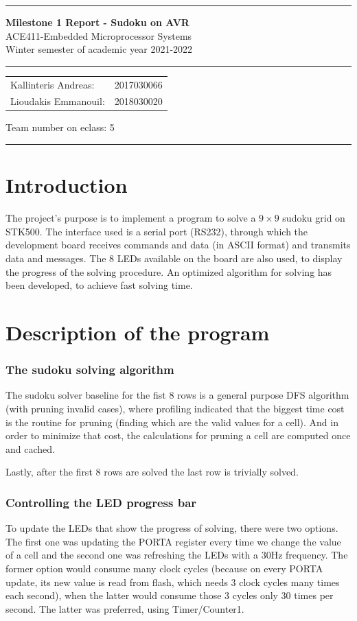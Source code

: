\documentclass[12pt, a4, hidelinks]{article}
\begin{document}
\noindent \rule{\textwidth}{3pt}
\begin{center}
	{\bf \Large{Milestone 1 Report - Sudoku on AVR}}\\
	ACE411-Embedded Microprocessor Systems \\
	Winter semester of academic year 2021-2022
	\rule{\textwidth}{0.2mm} 
	\begin{tabular}{l r}
		Kallinteris Andreas:& 2017030066 \\ 
		Lioudakis Emmanouil:      &2018030020 
	\end{tabular} \vrule \hspace{3mm}
	\indent	Team number on eclass:  5
	\rule{\textwidth}{1pt}
\end{center}

\section*{Introduction}
The project's purpose is to implement a program to solve a $9\times9$ sudoku grid on STK500. The interface used is a serial port (RS232), through which the development board receives commands and data (in ASCII format) and transmits data and messages. The 8 LEDs available on the board are also used, to display the progress of the solving procedure. An optimized algorithm for solving has been developed, to achieve fast solving time.


\section*{Description of the program}

\subsubsection*{The sudoku solving algorithm}
The sudoku solver baseline for the fist 8 rows is a general purpose DFS algorithm (with pruning invalid cases), where profiling indicated that the biggest time cost is the routine for pruning (finding which are the valid values for a cell).
And in order to minimize that cost, the calculations for pruning a cell are computed once and cached.

\noindent Lastly, after the first 8 rows are solved the last row is trivially solved.


\subsubsection*{Controlling the LED progress bar}
To update the LEDs that show the progress of solving, there were two options. The first one was updating the PORTA register every time we change the value of a cell and the second one was refreshing the LEDs with a 30Hz frequency. The former option would consume many clock cycles (because on every PORTA update, its new value is read from flash, which needs 3 clock cycles many times each second), when the latter would consume those 3 cycles only 30 times per second. The latter was preferred, using Timer/Counter1.
\end{document}
